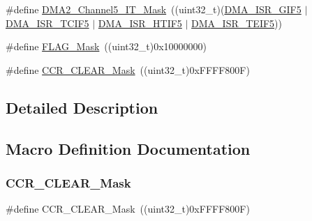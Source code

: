 \begin{DoxyCompactItemize}
\item 
\#define \mbox{\hyperlink{group___d_m_a___private___defines_gaedaf3e94d362754266807d6ccbab2e3e}{D\+M\+A2\+\_\+\+Channel5\+\_\+\+I\+T\+\_\+\+Mask}}~((uint32\+\_\+t)(\mbox{\hyperlink{group___peripheral___registers___bits___definition_ga83d4d9cba635d1e33e3477b773379cfd}{D\+M\+A\+\_\+\+I\+S\+R\+\_\+\+G\+I\+F5}} $\vert$ \mbox{\hyperlink{group___peripheral___registers___bits___definition_ga5ea57d09f13edbd6ad8afe9465e0fa70}{D\+M\+A\+\_\+\+I\+S\+R\+\_\+\+T\+C\+I\+F5}} $\vert$ \mbox{\hyperlink{group___peripheral___registers___bits___definition_ga3d1f2b8c82b1e20b4311af8ca9576736}{D\+M\+A\+\_\+\+I\+S\+R\+\_\+\+H\+T\+I\+F5}} $\vert$ \mbox{\hyperlink{group___peripheral___registers___bits___definition_ga42f9b12c4c80cbb7cd0f94f139c73de3}{D\+M\+A\+\_\+\+I\+S\+R\+\_\+\+T\+E\+I\+F5}}))
\item 
\#define \mbox{\hyperlink{group___d_m_a___private___defines_ga2be62bf481cd44de9ab604efe5595ff6}{F\+L\+A\+G\+\_\+\+Mask}}~((uint32\+\_\+t)0x10000000)
\item 
\#define \mbox{\hyperlink{group___d_m_a___private___defines_gac2c71cc75907c7c3467907e766dc4188}{C\+C\+R\+\_\+\+C\+L\+E\+A\+R\+\_\+\+Mask}}~((uint32\+\_\+t)0x\+F\+F\+F\+F800\+F)
\end{DoxyCompactItemize}


\subsection{Detailed Description}


\subsection{Macro Definition Documentation}
\mbox{\label{group___d_m_a___private___defines_gac2c71cc75907c7c3467907e766dc4188}} 
\subsubsection{\texorpdfstring{CCR\_CLEAR\_Mask}{CCR\_CLEAR\_Mask}}
{\footnotesize\ttfamily \#define C\+C\+R\+\_\+\+C\+L\+E\+A\+R\+\_\+\+Mask~((uint32\+\_\+t)0x\+F\+F\+F\+F800\+F)}

\mbox{\label{group___d_m_a___private___defines_ga76177263f2b9878765606f3bb8b9cc64}} 
